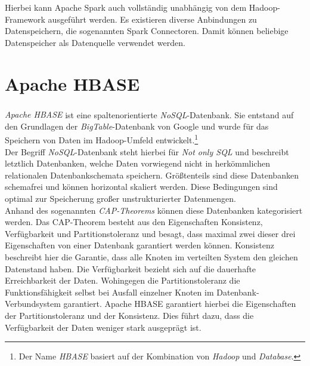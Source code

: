 \noindent
Hierbei kann Apache Spark auch vollständig unabhängig von dem Hadoop-Framework ausgeführt werden. Es existieren diverse Anbindungen zu Datenspeichern, die sogenannten Spark Connectoren. Damit können beliebige Datenspeicher als Datenquelle verwendet werden. \\

\section{Apache HBASE}
\label{sec:theory_hbase}
\textit{Apache HBASE\textsuperscript{\textregistered}} ist eine spaltenorientierte \textit{NoSQL}-Datenbank. Sie entstand auf den Grundlagen der \textit{BigTable}-Datenbank von Google und wurde für das Speichern von Daten im Hadoop-Umfeld entwickelt.\footnote{Der Name \textit{HBASE} basiert auf der Kombination von \textit{Hadoop} und \textit{Database}.}\\
Der Begriff \textit{NoSQL}-Datenbank steht hierbei für \textit{Not only SQL} und beschreibt letztlich Datenbanken, welche Daten vorwiegend nicht in herkömmlichen relationalen Datenbankschemata speichern. Größtenteils sind diese Datenbanken schemafrei und können horizontal skaliert werden. Diese Bedingungen sind optimal zur Speicherung großer unstrukturierter Datenmengen.\\
Anhand des sogenannten \textit{CAP-Theorems} können diese Datenbanken kategorisiert werden.
Das CAP-Theorem besteht aus den Eigenschaften Konsistenz, Verfügbarkeit und Partitionstoleranz und besagt, dass maximal zwei dieser drei Eigenschaften von einer Datenbank garantiert werden können. Konsistenz beschreibt hier die Garantie, dass alle Knoten im verteilten System den gleichen Datenstand haben. Die Verfügbarkeit bezieht sich auf die dauerhafte Erreichbarkeit der Daten. Wohingegen die Partitionstoleranz die Funktionsfähigkeit selbst bei Ausfall einzelner Knoten im Datenbank-Verbundsystem garantiert.
Apache HBASE garantiert hierbei die Eigenschaften der Partitionstoleranz und der Konsistenz. Dies führt dazu, dass die Verfügbarkeit der Daten weniger stark ausgeprägt ist.
\cite[S. 189 ff.]{big_data_praxis}\\

